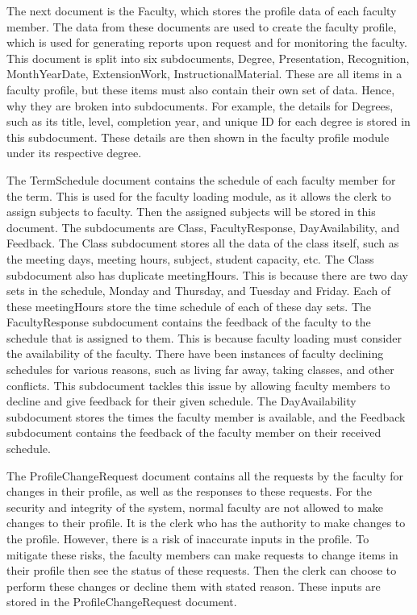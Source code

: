 The next document is the Faculty, which stores the profile data of each faculty member. The data from these documents are used to create the faculty profile, which is used for generating reports upon request and for monitoring the faculty. This document is split into six subdocuments, Degree, Presentation, Recognition, MonthYearDate, ExtensionWork, InstructionalMaterial. These are all items in a faculty profile, but these items must also contain their own set of data. Hence, why they are broken into subdocuments. For example, the details for Degrees, such as its title, level, completion year, and unique ID for each degree is stored in this subdocument. These details are then shown in the faculty profile module under its respective degree.

The TermSchedule document contains the schedule of each faculty member for the term. This is used for the faculty loading module, as it allows the clerk to assign subjects to faculty. Then the assigned subjects will be stored in this document. The subdocuments are Class, FacultyResponse, DayAvailability, and Feedback. The Class subdocument stores all the data of the class itself, such as the meeting days, meeting hours, subject, student capacity, etc. The Class subdocument also has duplicate meetingHours. This is because there are two day sets in the schedule, Monday and Thursday, and Tuesday and Friday. Each of these meetingHours store the time schedule of each of these day sets. The FacultyResponse subdocument contains the feedback of the faculty to the schedule that is assigned to them. This is because faculty loading must consider the availability of the faculty. There have been instances of faculty declining schedules for various reasons, such as living far away, taking classes, and other conflicts. This subdocument tackles this issue by allowing faculty members to decline and give feedback for their given schedule. The DayAvailability subdocument stores the times the faculty member is available, and the Feedback subdocument contains the feedback of the faculty member on their received schedule.

The ProfileChangeRequest document contains all the requests by the faculty for changes in their profile, as well as the responses to these requests. For the security and integrity of the system, normal faculty are not allowed to make changes to their profile. It is the clerk who has the authority to make changes to the profile. However, there is a risk of inaccurate inputs in the profile. To mitigate these risks, the faculty members can make requests to change items in their profile then see the status of these requests. Then the clerk can choose to perform these changes or decline them with stated reason. These inputs are stored in the ProfileChangeRequest document.

